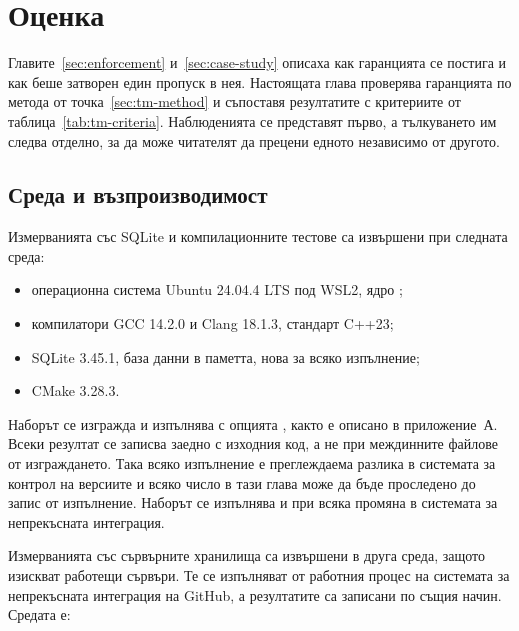 \section{Оценка}
\label{sec:evaluation}

Главите~\ref{sec:enforcement} и~\ref{sec:case-study} описаха как гаранцията се
постига и как беше затворен един пропуск в нея. Настоящата глава проверява
гаранцията по метода от точка~\ref{sec:tm-method} и съпоставя резултатите с
критериите от таблица~\ref{tab:tm-criteria}. Наблюденията се представят първо, а
тълкуването им следва отделно, за да може читателят да прецени едното независимо
от другото.

\subsection{Среда и възпроизводимост}
\label{sec:eval-env}

Измерванията със SQLite и компилационните тестове са извършени при следната среда:

\begin{itemize}
    \item операционна система Ubuntu 24.04.4 LTS под WSL2, ядро
          ;
    \item компилатори GCC 14.2.0 и Clang 18.1.3, стандарт C++23;
    \item SQLite 3.45.1, база данни в паметта, нова за всяко изпълнение;
    \item CMake 3.28.3.
\end{itemize}

Наборът се изгражда и изпълнява с опцията , както е
описано в приложение~А. Всеки резултат се записва заедно с
изходния код, а не при междинните файлове от изграждането. Така всяко изпълнение
е преглеждаема разлика в системата за контрол на версиите и всяко число в тази
глава може да бъде проследено до запис от изпълнение. Наборът се изпълнява и при
всяка промяна в системата за непрекъсната интеграция.

Измерванията със сървърните хранилища са извършени в друга среда, защото
изискват работещи сървъри. Те се изпълняват от работния процес  на системата за непрекъсната интеграция на GitHub, а
резултатите са записани по същия начин. Средата е:

